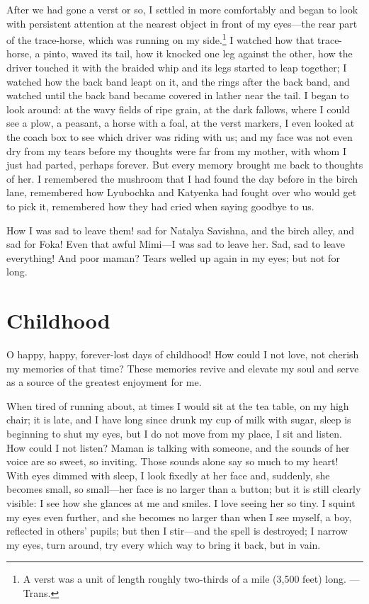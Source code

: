 After we had gone a verst or so, I settled in more comfortably and began to look with persistent attention at the nearest object in front of my eyes---the rear part of the trace-horse, which was running on my side.\footnote{A verst was a unit of length roughly two-thirds of a mile (3,500 feet) long. ---Trans.} I watched how that trace-horse, a pinto, waved its tail, how it knocked one leg against the other, how the driver touched it with the braided whip and its legs started to leap together; I watched how the back band leapt on it, and the rings after the back band, and watched until the back band became covered in lather near the tail. I began to look around: at the wavy fields of ripe grain, at the dark fallows, where I could see a plow, a peasant, a horse with a foal, at the verst markers, I even looked at the coach box to see which driver was riding with us; and my face was not even dry from my tears before my thoughts were far from my mother, with whom I just had parted, perhaps forever. But every memory brought me back to thoughts of her. I remembered the mushroom that I had found the day before in the birch lane, remembered how Lyubochka and Katyenka had fought over who would get to pick it, remembered how they had cried when saying goodbye to us.

How I was sad to leave them! sad for Natalya Savishna, and the birch alley, and sad for Foka! Even that awful Mimi---I was sad to leave her. Sad, sad to leave everything! And poor maman? Tears welled up again in my eyes; but not for long.

\chapter{Childhood}

O happy, happy, forever-lost days of childhood! How could I not love, not cherish my memories of that time? These memories revive and elevate my soul and serve as a source of the greatest enjoyment for me.

When tired of running about, at times I would sit at the tea table, on my high chair; it is late, and I have long since drunk my cup of milk with sugar, sleep is beginning to shut my eyes, but I do not move from my place, I sit and listen. How could I not listen? Maman is talking with someone, and the sounds of her voice are so sweet, so inviting. Those sounds alone say so much to my heart! With eyes dimmed with sleep, I look fixedly at her face and, suddenly, she becomes small, so small---her face is no larger than a button; but it is still clearly visible: I see how she glances at me and smiles. I love seeing her so tiny. I squint my eyes even further, and she becomes no larger than when I see myself, a boy, reflected in others' pupils; but then I stir---and the spell is destroyed; I narrow my eyes, turn around, try every which way to bring it back, but in vain.

